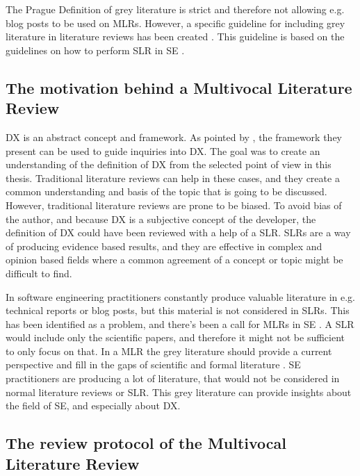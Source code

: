 \documentclass[english, 12pt, a4paper, sci, utf8, a-1b, online]{aaltothesis}
\begin{document}
The Prague Definition of grey literature is strict and therefore not allowing e.g. blog posts to be used on MLRs. However, a specific guideline for including grey literature in literature reviews has been created \parencite{guidelines-for-MLR}. This guideline is based on the guidelines on how to perform SLR in SE \parencite{guidelines-for-SLR-in-SE}.

\subsection{The motivation behind a Multivocal Literature Review}

DX is an abstract concept and framework. As pointed by \textcite{fagerholm-doctoral-thesis}, the framework they present can be used to guide inquiries into DX. The goal was to create an understanding of the definition of DX from the selected point of view in this thesis. Traditional literature reviews can help in these cases, and they create a common understanding and basis of the topic that is going to be discussed. However, traditional literature reviews are prone to be biased. To avoid bias of the author, and because DX is a subjective concept of the developer, the definition of DX could have been reviewed with a help of a SLR. SLRs are a way of producing evidence based results, and they are effective in complex and opinion based fields where a common agreement of a concept or topic might be difficult to find.

In software engineering practitioners constantly produce valuable literature in e.g. technical reports or blog posts, but this material is not considered in SLRs. This has been identified as a problem, and there's been a call for MLRs in SE \parencite{the-need-for-MLR}. A SLR would include only the scientific papers, and therefore it might not be sufficient to only focus on that. In a MLR the grey literature should provide a current perspective and fill in the gaps of scientific and formal literature \parencite{guidelines-for-MLR}. SE practitioners are producing a lot of literature, that would not be considered in normal literature reviews or SLR. This grey literature can provide insights about the field of SE, and especially about DX.

\subsection{The review protocol of the Multivocal Literature Review}

\newcommand{\mlrdxlink}{https://bit.ly/31QzQ7z}
\end{document}
